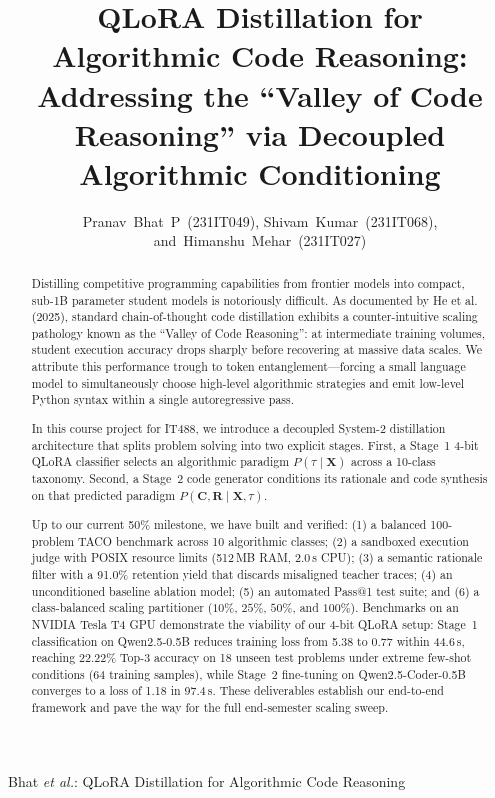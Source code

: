 \documentclass[journal]{IEEEtran}
\begin{document}
\title{QLoRA Distillation for Algorithmic Code Reasoning:\\ Addressing the ``Valley of Code Reasoning'' via Decoupled Algorithmic Conditioning}

\author{Pranav~Bhat~P~(231IT049),
        Shivam~Kumar~(231IT068),
        and~Himanshu~Mehar~(231IT027)%
}

%
{Bhat \MakeLowercase{\textit{et al.}}: QLoRA Distillation for Algorithmic Code Reasoning}

\maketitle

\begin{abstract}
Distilling competitive programming capabilities from frontier models into compact, sub-1B parameter student models is notoriously difficult. As documented by He et al. (2025), standard chain-of-thought code distillation exhibits a counter-intuitive scaling pathology known as the ``Valley of Code Reasoning'': at intermediate training volumes, student execution accuracy drops sharply before recovering at massive data scales. We attribute this performance trough to token entanglement---forcing a small language model to simultaneously choose high-level algorithmic strategies and emit low-level Python syntax within a single autoregressive pass. 

In this course project for IT488, we introduce a decoupled System-2 distillation architecture that splits problem solving into two explicit stages. First, a Stage~1 4-bit QLoRA classifier selects an algorithmic paradigm $P(\tau \mid \mathbf{X})$ across a 10-class taxonomy. Second, a Stage~2 code generator conditions its rationale and code synthesis on that predicted paradigm $P(\mathbf{C}, \mathbf{R} \mid \mathbf{X}, \tau)$. 

Up to our current 50\% milestone, we have built and verified: (1) a balanced 100-problem TACO benchmark across 10 algorithmic classes; (2) a sandboxed execution judge with POSIX resource limits (512\,MB RAM, 2.0\,s CPU); (3) a semantic rationale filter with a 91.0\% retention yield that discards misaligned teacher traces; (4) an unconditioned baseline ablation model; (5) an automated Pass@1 test suite; and (6) a class-balanced scaling partitioner ($10\%$, $25\%$, $50\%$, and $100\%$). Benchmarks on an NVIDIA Tesla T4 GPU demonstrate the viability of our 4-bit QLoRA setup: Stage~1 classification on Qwen2.5-0.5B reduces training loss from 5.38 to 0.77 within 44.6\,s, reaching 22.22\% Top-3 accuracy on 18 unseen test problems under extreme few-shot conditions (64 training samples), while Stage~2 fine-tuning on Qwen2.5-Coder-0.5B converges to a loss of 1.18 in 97.4\,s. These deliverables establish our end-to-end framework and pave the way for the full end-semester scaling sweep.
\end{abstract}
\end{document}

